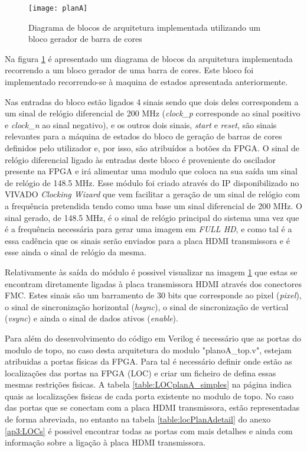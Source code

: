 \begin{figure}[h!]
	\begin{center}
		\leavevmode
		\texttt{[image: planA]}
		\caption{Diagrama de blocos de arquitetura implementada utilizando um bloco gerador de barra de cores}
		\label{fig:planA}
	\end{center}
\end{figure}

Na figura \ref{fig:planA} é apresentado um diagrama de blocos da arquitetura implementada recorrendo a um bloco gerador de uma barra de cores. Este bloco foi implementado recorrendo-se à maquina de estados apresentada anteriormente.

Nas entradas do bloco estão ligados 4 sinais sendo que dois deles correspondem a um sinal de relógio diferencial de 200 MHz (\textit{clock\_p} corresponde ao sinal positivo e \textit{clock\_n} ao sinal negativo), e os outros dois sinais, \textit{start} e \textit{reset}, são sinais relevantes para a máquina de estados do bloco de geração de barras de cores definidos pelo utilizador e, por isso, são atribuídos a botões da FPGA. O sinal de relógio diferencial ligado às entradas deste bloco é proveniente do oscilador presente na FPGA e irá alimentar uma modulo que coloca na sua saída um sinal de relógio de 148.5 MHz. Esse módulo foi criado através do IP disponibilizado no VIVADO \textit{Clocking Wizard} que vem facilitar a geração de um sinal de relógio com a frequência pretendida tendo como uma base um sinal diferencial de 200 MHz. O sinal gerado, de 148.5 MHz, é o sinal de relógio principal do sistema uma vez que é a frequência necessária para gerar uma imagem em \textit{FULL HD}, e como tal é a essa cadência que os sinais serão enviados para a placa HDMI transmissora e é esse ainda o sinal de relógio da mesma.

Relativamente às saída do módulo é possivel visualizar na imagem \ref{fig:planA} que estas se encontram diretamente ligadas à placa transmissora HDMI através dos conectores FMC. Estes sinais são um barramento de 30 bits que corresponde ao pixel (\textit{pixel}), o sinal de sincronização horizontal (\textit{hsync}), o sinal de sincronização de vertical (\textit{vsync}) e ainda o sinal de dados ativos (\textit{enable}).

Para além do desenvolvimento do código em Verilog é necessário que as portas do modulo de topo, no caso desta arquitetura do modulo "planoA\_top.v", estejam atribuidas a portas físicas da FPGA. Para tal é necessário definir onde estão as localizações das portas na FPGA (LOC) e criar um ficheiro de defina essas mesmas restrições fisicas. A tabela \ref{table:LOCplanA_simples} na página \pageref{table:LOCplanA_simples} indica quais as localizações fisicas de cada porta existente no modulo de topo. No caso das portas que se conectam com a placa HDMI transmissora, estão representadas de forma abreviada, no entanto na tabela \ref{table:locPlanAdetail} do anexo \ref{ap3:LOCs} é possivel encontrar todas as portas com mais detalhes e ainda com informação sobre a ligação à placa HDMI transmissora.

